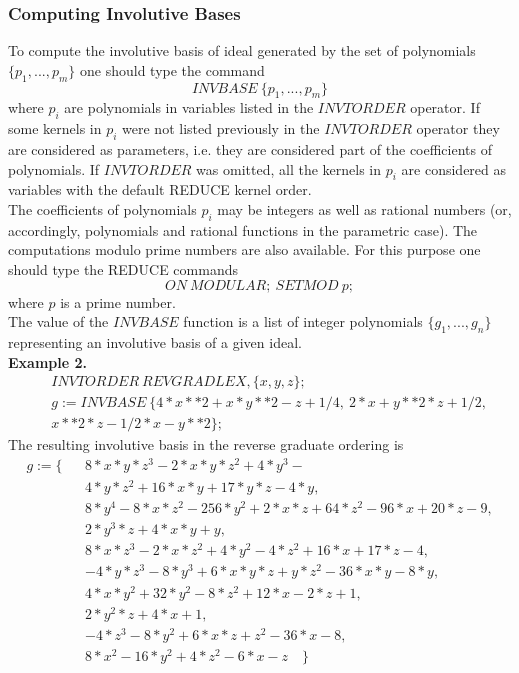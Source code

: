 \subsubsection{Computing Involutive Bases}
To compute the involutive basis of ideal generated by the set of
polynomials $\{p_1,...,p_m\}$ one should type the command
$$ INVBASE \> \{p_1,...,p_m\} $$
where $p_i$ are polynomials in variables listed in the
$INVTORDER$ operator. If some kernels in $p_i$ were not listed
previously in the $INVTORDER$ operator they are considered as
parameters, i.e. they are considered part of the coefficients of
polynomials. If $INVTORDER$ was omitted, all the kernels
in $p_i$ are considered as variables with the default REDUCE
kernel order.\\
The coefficients of polynomials $p_i$ may be integers as well as
rational numbers (or, accordingly, polynomials and rational functions
in the parametric case). The computations modulo prime numbers are
also available. For this purpose one should type the REDUCE commands
$$ ON \> MODULAR;\> SETMOD \> p; $$
where $p$ is a prime number.\\
The value of the $INVBASE$ function is a list of integer polynomials
$\{g_1,...,g_n\}$ representing an involutive basis of a given ideal.\\
\newpage
\noindent
{\bf Example 2.}
\begin{eqnarray*}
& & INVTORDER \> REVGRADLEX,\{x,y,z\}; \\
& & g:= INVBASE \> \{4*x**2 + x*y**2 - z + 1/4,\>
                     2*x + y**2*z + 1/2,\> \\
& &    x**2*z - 1/2*x - y**2 \};
\end{eqnarray*}
The resulting involutive basis in the reverse graduate ordering is
\begin{eqnarray*}
g := \{& & 8*x*y*z^3  - 2*x*y*z^2  + 4*y^3  - \\
& &  4*y*z^2 + 16*x*y + 17*y*z - 4*y,\\
& &  8*y^4  - 8*x*z^2  - 256*y^2  + 2*x*z + 64*z^2  - 96*x + 20*z - 9,\\
& &  2*y^3*z + 4*x*y + y,\\
& &  8*x*z^3  - 2*x*z^2  + 4*y^2  - 4*z^2 + 16*x + 17*z - 4,\\
& & - 4*y*z^3  - 8*y^3  + 6*x*y*z + y*z^2  - 36*x*y - 8*y,\\
& &  4*x*y^2  + 32*y^2  - 8*z^2  + 12*x - 2*z + 1,\\
& &  2*y^2*z + 4*x + 1,\\
& & - 4*z^3  - 8*y^2  + 6*x*z + z^2  - 36*x - 8,\\
& &  8*x^2  - 16*y^2  + 4*z^2  - 6*x - z \quad \}
\end{eqnarray*}
